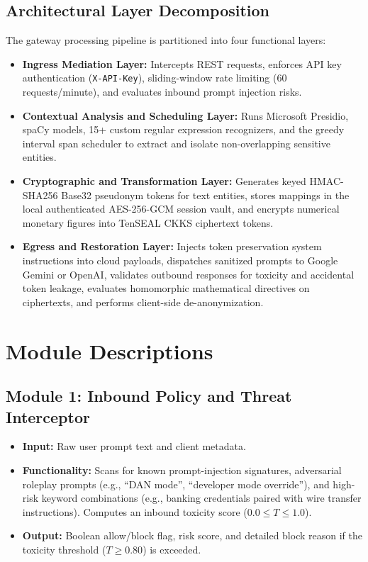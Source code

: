 \subsection{Architectural Layer Decomposition}
The gateway processing pipeline is partitioned into four functional layers:
\begin{itemize}[leftmargin=*]
    \item \textbf{Ingress Mediation Layer:} Intercepts REST requests, enforces API key authentication (\texttt{X-API-Key}), sliding-window rate limiting (60 requests/minute), and evaluates inbound prompt injection risks.
    \item \textbf{Contextual Analysis and Scheduling Layer:} Runs Microsoft Presidio, spaCy models, 15+ custom regular expression recognizers, and the greedy interval span scheduler to extract and isolate non-overlapping sensitive entities.
    \item \textbf{Cryptographic and Transformation Layer:} Generates keyed HMAC-SHA256 Base32 pseudonym tokens for text entities, stores mappings in the local authenticated AES-256-GCM session vault, and encrypts numerical monetary figures into TenSEAL CKKS ciphertext tokens.
    \item \textbf{Egress and Restoration Layer:} Injects token preservation system instructions into cloud payloads, dispatches sanitized prompts to Google Gemini or OpenAI, validates outbound responses for toxicity and accidental token leakage, evaluates homomorphic mathematical directives on ciphertexts, and performs client-side de-anonymization.
\end{itemize}

\section{Module Descriptions}

\subsection{Module 1: Inbound Policy and Threat Interceptor}
\begin{itemize}[leftmargin=*]
    \item \textbf{Input:} Raw user prompt text and client metadata.
    \item \textbf{Functionality:} Scans for known prompt-injection signatures, adversarial roleplay prompts (e.g., ``DAN mode'', ``developer mode override''), and high-risk keyword combinations (e.g., banking credentials paired with wire transfer instructions). Computes an inbound toxicity score ($0.0 \le T \le 1.0$).
    \item \textbf{Output:} Boolean allow/block flag, risk score, and detailed block reason if the toxicity threshold ($T \ge 0.80$) is exceeded.
\end{itemize}

